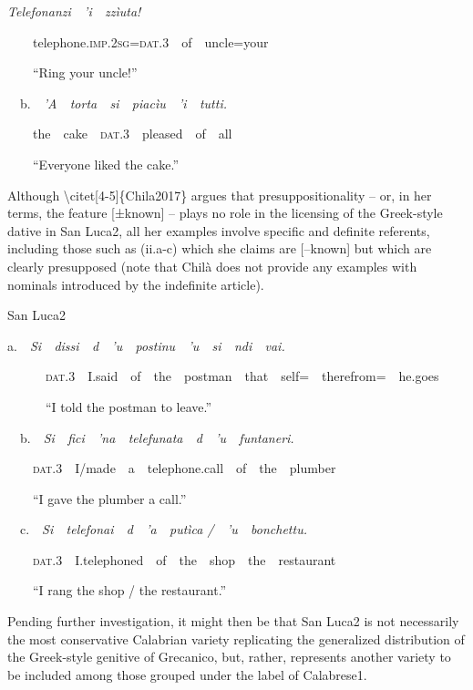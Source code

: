 \documentclass[output=paper,modfonts,nonflat]{langsci/langscibook}
\begin{document}
\begin{styleStandard}
{\begin{listWWNumxleveli}
\setcounter{listWWNumxlevelii}{0}
\begin{listWWNumxlevelii}
\item 
\begin{styleFootnote}
\textit{Telefonanzi\ \ ’i\ \ zzìuta!\ \ }
\end{styleFootnote}
\end{listWWNumxlevelii}
\end{listWWNumxleveli}
\ \ \ \ telephone.\textsc{imp.2sg=dat.3}\ \ of\ \ uncle=your\par \ \ \ \ “Ring your uncle!”\par \ \ b.\ \ \textit{’A\ \ torta\ \ si\ \ piacìu\ \ ’i\ \ tutti.}\par \ \ \ \ the\ \ cake\ \ \textsc{dat}.3\ \ pleased\ \ of\ \ all\par \ \ \ \ “Everyone liked the cake.”\par \par Although {\textbackslash}citet[4-5]\{Chila2017\} argues that presuppositionality – or, in her terms, the feature [±known] – plays no role in the licensing of the Greek-style dative in San Luca2, all her examples involve specific and definite referents, including those such as (ii.a-c) which she claims are [–known] but which are clearly presupposed (note that Chilà does not provide any examples with nominals introduced by the indefinite article). \par \par \begin{listWWNumxleveli}
\item 
\begin{styleFootnote}
San Luca2
\end{styleFootnote}
\end{listWWNumxleveli}
a.\ \ \textit{Si\ \ dissi\ \ d\ \ ’u\ \ postinu\ \ ’u\ \ si\ \ ndi\ \ vai.}\par \ \ \ \ \ \ \textsc{dat}.3\ \ I.said\ \ of\ \ the\ \ postman\ \ that\ \ self=\ \ therefrom=\ \ he.goes\par \ \ \ \ \ \ “I told the postman to leave.”\par \ \ b.\ \ \textit{Si\ \ fici\ \ ’na\ \ telefunata\ \ d\ \ ’u\ \ funtaneri.} \par \ \ \ \ \textsc{dat}.3\ \ I/made\ \ a\ \ telephone.call\ \ of\ \ the\ \ plumber\par \ \ \ \ “I gave the plumber a call.”\par \ \ c.\ \ \textit{Si\ \ telefonai\ \ d\ \ ’a\ \ putìca /\ \ ’u\ \ bonchettu.}\par \ \ \ \ \textsc{dat}.3\ \ I.telephoned\ \ of\ \ the\ \ shop\ \ the\ \ restaurant\par \ \ \ \ “I rang the shop / the restaurant.”\par \par Pending further investigation, it might then be that San Luca2 is not necessarily the most conservative Calabrian variety replicating the generalized distribution of the Greek-style genitive of Grecanico, but, rather, represents another variety to be included among those grouped under the label of Calabrese1.}
\end{styleStandard}
\end{document}
